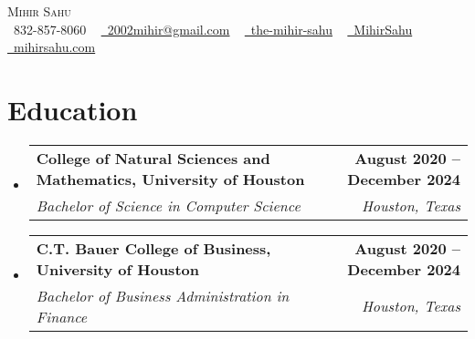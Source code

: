 \documentclass[letterpaper,11pt]{article}
\makeatletter
\newcommand{\resumeSubheading}[4]{
  \vspace{-2pt}\item
    \begin{tabular*}{1.0\textwidth}[t]{l@{\extracolsep{\fill}}r}
      \textbf{#1} & \textbf{\small #2} \\
      \textit{\small#3} & \textit{\small #4} \\
    \end{tabular*}\vspace{-7pt}
}
\newcommand{\resumeSubHeadingListStart}{\begin{itemize}[leftmargin=0.0in, label={}]}
\newcommand{\resumeSubHeadingListEnd}{\end{itemize}}
\makeatother
\begin{document}

\begin{center}
    {\Huge \scshape Mihir Sahu} \\ \vspace{1pt}
    \small \raisebox{-0.1\height}\faPhone\ 832-857-8060 ~ \href{mailto:2002mihir@gmail.com}{\raisebox{-0.2\height}\faEnvelope\  2002mihir@gmail.com} ~ 
    \href{https://linkedin.com/in/the-mihir-sahu}{\raisebox{-0.2\height}\faLinkedin\ the-mihir-sahu}  ~
    \href{https://github.com/MihirSahu}{\raisebox{-0.2\height}\faGithub\ MihirSahu} ~
    \href{https://mihirsahu.com}{\raisebox{-0.2\height}\faGlobeAmericas\ mihirsahu.com}
    \vspace{-8pt}
\end{center}


\section{Education}
  \resumeSubHeadingListStart
    \resumeSubheading
      {College of Natural Sciences and Mathematics, University of Houston}{August 2020 -- December 2024}
      {Bachelor of Science in Computer Science}{Houston, Texas}
    \resumeSubheading
      {C.T. Bauer College of Business, University of Houston}{August 2020 -- December 2024}
      {Bachelor of Business Administration in Finance}{Houston, Texas}
  \resumeSubHeadingListEnd
  
\end{document}
